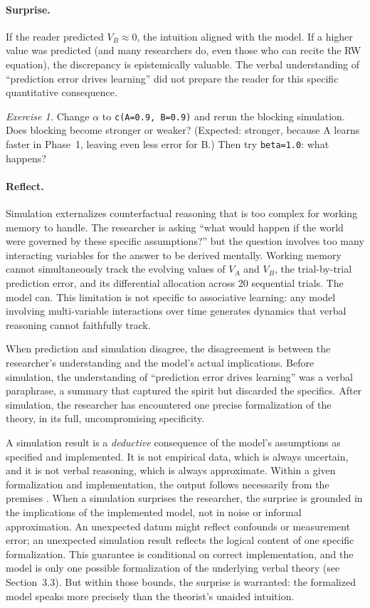 \documentclass[fleqn,10pt]{wlscirep}
\begin{document}
\begin{linenumbers}
\paragraph{Surprise.} If the reader predicted $V_B \approx 0$, the intuition aligned with the model. If a higher value was predicted (and many researchers do, even those who can recite the RW equation), the discrepancy is epistemically valuable. The verbal understanding of ``prediction error drives learning'' did not prepare the reader for this specific quantitative consequence.

\emph{Exercise 1.} Change $\alpha$ to \texttt{c(A=0.9, B=0.9)} and rerun the blocking simulation. Does blocking become stronger or weaker? (Expected: stronger, because A learns faster in Phase~1, leaving even less error for B.) Then try \texttt{beta=1.0}: what happens?

\paragraph{Reflect.} Simulation externalizes counterfactual reasoning that is too complex for working memory to handle. The researcher is asking ``what would happen if the world were governed by these specific assumptions?'' but the question involves too many interacting variables for the answer to be derived mentally. Working memory cannot simultaneously track the evolving values of $V_A$ and $V_B$, the trial-by-trial prediction error, and its differential allocation across 20 sequential trials. The model can. This limitation is not specific to associative learning: any model involving multi-variable interactions over time generates dynamics that verbal reasoning cannot faithfully track.

When prediction and simulation disagree, the disagreement is between the researcher's understanding and the model's actual implications. Before simulation, the understanding of ``prediction error drives learning'' was a verbal paraphrase, a summary that captured the spirit but discarded the specifics. After simulation, the researcher has encountered one precise formalization of the theory, in its full, uncompromising specificity.

A simulation result is a \emph{deductive} consequence of the model's assumptions as specified and implemented. It is not empirical data, which is always uncertain, and it is not verbal reasoning, which is always approximate. Within a given formalization and implementation, the output follows necessarily from the premises \citep{winsberg2010science}. When a simulation surprises the researcher, the surprise is grounded in the implications of the implemented model, not in noise or informal approximation. An unexpected datum might reflect confounds or measurement error; an unexpected simulation result reflects the logical content of one specific formalization. This guarantee is conditional on correct implementation, and the model is only one possible formalization of the underlying verbal theory (see Section~3.3). But within those bounds, the surprise is warranted: the formalized model speaks more precisely than the theorist's unaided intuition.


\end{linenumbers}
\end{document}
